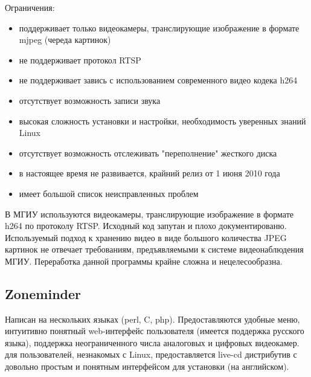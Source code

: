 \medskip

Ограничения:
\smallskip
\begin{itemize}
	\item
	поддерживает только видеокамеры, транслирующие изображение в формате mjpeg (череда картинок)
	\item не поддерживает протокол RTSP
	\item не поддерживает завись с использованием современного видео кодека h264
	\item отсутствует возможность записи звука
	\item высокая сложность установки и настройки, необходимость уверенных знаний Linux
	\item отсутствует возможность отслеживать "переполнение" жесткого диска
	\item в настоящее время не развивается, крайний релиз от 1 июня 2010 года
	\item имеет большой список неисправленных проблем
\end{itemize}

\medskip

В МГИУ используются видеокамеры, транслирующие изображение в формате h264 по протоколу RTSP.
Исходный код запутан и плохо документированю.
Используемый подход к хранению видео в виде большого количества JPEG картинок не
отвечает требованиям, предъявляемыми к системе видеонаблюдения МГИУ.
Переработка данной программы крайне сложна и нецелесообразна.

\subsection{Zoneminder}

Написан на нескольких языках (perl, C, php).
Предоставляются удобные меню, интуитивно понятный web-интерфейс пользователя
(имеется поддержка русского языка), поддержка неограниченного числа аналоговых
и цифровых видеокамер. для пользователей, незнакомых с Linux, предоставляется live-cd
дистрибутив с довольно простым и понятным интерфейсом для установки (на английском).

\medskip

